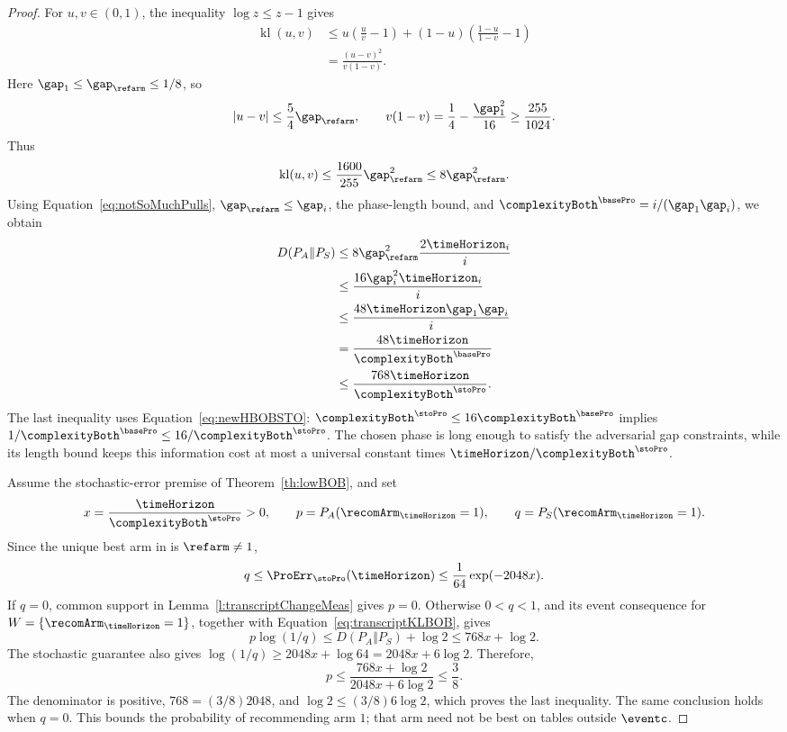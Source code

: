 \begin{proof}
For $u,v\in(0,1)$, the inequality $\log z\leq z-1$ gives
\begin{align*}
\operatorname{kl}(u,v)
&\leq u\left(\frac{u}{v}-1\right)
+(1-u)\left(\frac{1-u}{1-v}-1\right)\\
&=\frac{(u-v)^2}{v(1-v)}.
\end{align*}
Here $\gap_1\leq\gap_{\refarm}\leq1/8$, so
\[
|u-v|\leq\frac54\gap_{\refarm},\qquad
v(1-v)=\frac14-\frac{\gap_1^2}{16}\geq\frac{255}{1024}.
\]
Thus
\[
\operatorname{kl}(u,v)
\leq\frac{1600}{255}\gap_{\refarm}^2\leq8\gap_{\refarm}^2.
\]
Using Equation~\ref{eq:notSoMuchPulls}, $\gap_{\refarm}\leq\gap_i$,
the phase-length bound, and
$\complexityBoth^{\basePro}=i/(\gap_1\gap_i)$, we obtain
\begin{equation}\label{eq:transcriptKLBOB}
\begin{aligned}
D(P_A\Vert P_S)
&\leq8\gap_{\refarm}^2\frac{2\timeHorizon_i}{i}\\
&\leq\frac{16\gap_i^2\timeHorizon_i}{i}\\
&\leq\frac{48\timeHorizon\gap_1\gap_i}{i}\\
&=\frac{48\timeHorizon}{\complexityBoth^{\basePro}}\\
&\leq\frac{768\timeHorizon}{\complexityBoth^{\stoPro}}.
\end{aligned}
\end{equation}
The last inequality uses Equation~\ref{eq:newHBOBSTO}:
$\complexityBoth^{\stoPro}\leq16\complexityBoth^{\basePro}$ implies
$1/\complexityBoth^{\basePro}\leq16/\complexityBoth^{\stoPro}$.
The chosen phase is long enough to satisfy the adversarial gap
constraints, while its length bound keeps this information cost at
most a universal constant times $\timeHorizon/\complexityBoth^{\stoPro}$.

Assume the stochastic-error premise of Theorem~\ref{th:lowBOB}, and set
\[
x=\frac{\timeHorizon}{\complexityBoth^{\stoPro}}>0,\qquad
p=P_A(\recomArm_{\timeHorizon}=1),\qquad
q=P_S(\recomArm_{\timeHorizon}=1).
\]
Since the unique best arm in \stoPro{} is $\refarm\neq1$,
\[
q\leq\ProErr_{\stoPro}(\timeHorizon)
\leq\frac{1}{64}\exp(-2048x).
\]
If $q=0$, common support in Lemma~\ref{l:transcriptChangeMeas} gives
$p=0$. Otherwise $0<q<1$, and its event consequence for
$W=\{\recomArm_{\timeHorizon}=1\}$, together with
Equation~\ref{eq:transcriptKLBOB}, gives
\[
p\log(1/q)\leq D(P_A\Vert P_S)+\log2\leq768x+\log2.
\]
The stochastic guarantee also gives
$\log(1/q)\geq2048x+\log64=2048x+6\log2$. Therefore,
\[
p\leq\frac{768x+\log2}{2048x+6\log2}\leq\frac38.
\]
The denominator is positive, $768=(3/8)2048$, and
$\log2\leq(3/8)6\log2$, which proves the last inequality.
The same conclusion holds when $q=0$.
This bounds the probability of recommending arm $1$; that arm need
not be best on tables outside $\eventc$.


\end{proof}
